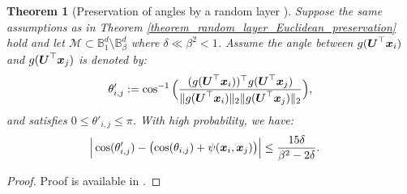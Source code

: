 \documentclass{article}
\newtheorem{theorem}{Theorem}
\def\b{\ensuremath\boldsymbol}
\begin{document}
\begin{theorem}[Preservation of angles by a random layer {\citep[Theorem 4]{giryes2016deep}}]\label{theorem_random_layer_angle_preservation}
Suppose the same assumptions as in Theorem \ref{theorem_random_layer_Euclidean_preservation} hold and let $\mathcal{M} \subset \mathbb{B}_1^d \setminus \mathbb{B}_\beta^d$ where $\delta \ll \beta^2 < 1$. 
Assume the angle between $g(\b{U}^\top \b{x}_i)$ and $g(\b{U}^\top \b{x}_j)$ is denoted by:
\begin{align*}
\theta'_{i,j} := \cos^{-1}\Big(\frac{(g(\b{U}^\top \b{x}_i))^\top g(\b{U}^\top \b{x}_j)}{\|g(\b{U}^\top \b{x}_i)\|_2 \|g(\b{U}^\top \b{x}_j)\|_2}\Big),
\end{align*}
and satisfies $0 \leq \theta'_{i,j} \leq \pi$. 
With high probability, we have:
\begin{align}\label{equation_random_layer_angle_preservation}
\Big| &\cos(\theta'_{i,j}) - \big(\!\cos(\theta_{i,j}) + \psi(\b{x}_i, \b{x}_j)\big) \Big| \leq \frac{15 \delta}{\beta^2 - 2 \delta}. 
\end{align}
\end{theorem}
\begin{proof}
Proof is available in {\citep[Appendix B]{giryes2016deep}}.
\end{proof}
\end{document}
